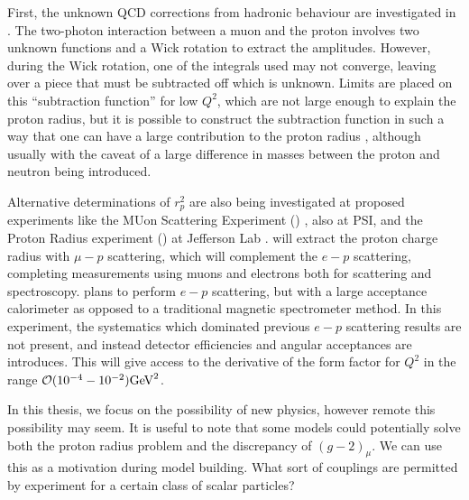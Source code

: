 First, the unknown QCD corrections from hadronic behaviour are investigated in \cite{Carlson:2015jba}.
The two-photon interaction between a muon and the proton involves two unknown functions and a Wick rotation to extract the amplitudes.
However, during the Wick rotation, one of the integrals used may not converge, leaving over a piece that must be subtracted off which is unknown.
Limits are placed on this ``subtraction function'' for low $Q^2$, which are not large enough to explain the proton radius, but it is possible to construct the subtraction function in such a way that one can have a large contribution to the proton radius \cite{Miller:2012ne}, although usually with the caveat of a large difference in masses between the proton and neutron being introduced.

Alternative determinations of $r_p^2$ are also being investigated at proposed experiments like the MUon Scattering Experiment (\muse) \cite{Mesick:2015gta}, also at PSI, and the Proton Radius experiment (\prad) at Jefferson Lab \cite{Gasparian:2014rna}. 
\muse will extract the proton charge radius with $\mu-p$ scattering, which will complement the $e-p$ scattering, completing measurements using muons and electrons both for scattering and spectroscopy.
\prad plans to perform $e-p$ scattering, but with a large acceptance calorimeter as opposed to a traditional magnetic spectrometer method.
In this experiment, the systematics which dominated previous $e-p$ scattering results are not present, and instead detector efficiencies and angular acceptances are introduces.
This will give access to the derivative of the form factor for $Q^2$ in the range $\operatorname{\mathcal{O}}(10^{-4} - 10^{-2})\textrm{GeV}^2$.

In this thesis, we focus on the possibility of new physics, however remote this possibility may seem.
It is useful to note that some models could potentially solve both the proton radius problem and the discrepancy of $(g-2)_\mu$.
We can use this as a motivation during model building.
What sort of couplings are permitted by experiment for a certain class of scalar particles?
